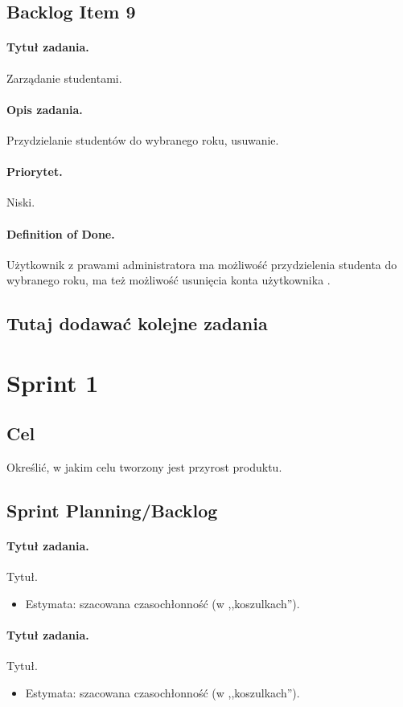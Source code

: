 \documentclass[a4paper]{article}
\begin{document}
\subsection{Backlog Item 9}
\paragraph{Tytuł zadania.} Zarządanie studentami.
\paragraph{Opis zadania.} Przydzielanie studentów do wybranego roku, usuwanie.
\paragraph{Priorytet.} Niski.
\paragraph{Definition of Done.} Użytkownik z prawami administratora ma możliwość przydzielenia studenta do wybranego roku, ma też możliwość usunięcia konta użytkownika .

\subsection*{Tutaj dodawać kolejne zadania}

\section{Sprint 1}
\subsection{Cel} Określić, w jakim celu tworzony jest przyrost produktu.
\subsection{Sprint Planning/Backlog}

\paragraph{Tytuł zadania.} Tytuł.
\begin{itemize}
\item Estymata: szacowana czasochłonność (w ,,koszulkach'').
\end{itemize}

\paragraph{Tytuł zadania.} Tytuł.
\begin{itemize}
\item Estymata: szacowana czasochłonność (w ,,koszulkach'').
\end{itemize}
\end{document}
